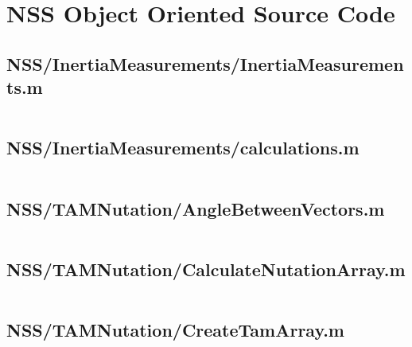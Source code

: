 
\chapter{NSS Object Oriented Source Code}
\label{ch:NSSObjectOrientedSourceCode}

\linespread{1}

\pagebreak
\section*{NSS/InertiaMeasurements/InertiaMeasurements.m}\label{code:NSS/InertiaMeasurements/InertiaMeasurements.m}
\inputminted[linenos,fontsize=\scriptsize]{matlab}{/home/dcouture/git/mathyourlife/TSatPy/beta_versions/matlab_object_oriented/InertiaMeasurements/InertiaMeasurements.m}

\pagebreak
\section*{NSS/InertiaMeasurements/calculations.m}\label{code:NSS/InertiaMeasurements/calculations.m}
\inputminted[linenos,fontsize=\scriptsize]{matlab}{/home/dcouture/git/mathyourlife/TSatPy/beta_versions/matlab_object_oriented/InertiaMeasurements/calculations.m}

\pagebreak
\section*{NSS/TAMNutation/AngleBetweenVectors.m}\label{code:NSS/TAMNutation/AngleBetweenVectors.m}
\inputminted[linenos,fontsize=\scriptsize]{matlab}{/home/dcouture/git/mathyourlife/TSatPy/beta_versions/matlab_object_oriented/TAMNutation/AngleBetweenVectors.m}

\pagebreak
\section*{NSS/TAMNutation/CalculateNutationArray.m}\label{code:NSS/TAMNutation/CalculateNutationArray.m}
\inputminted[linenos,fontsize=\scriptsize]{matlab}{/home/dcouture/git/mathyourlife/TSatPy/beta_versions/matlab_object_oriented/TAMNutation/CalculateNutationArray.m}

\pagebreak
\section*{NSS/TAMNutation/CreateTamArray.m}\label{code:NSS/TAMNutation/CreateTamArray.m}
\inputminted[linenos,fontsize=\scriptsize]{matlab}{/home/dcouture/git/mathyourlife/TSatPy/beta_versions/matlab_object_oriented/TAMNutation/CreateTamArray.m}

